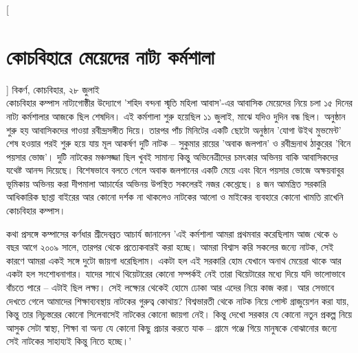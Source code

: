 \documentclass{article}
\newcommand\EN[1]{	 
\fontsize{#1}{#1}\fontspec{Ubuntu}}
\newcommand\BN[1]{ %
\fontsize{#1}{#1}\fontspec[Script=Bengali]{Baban12}}
\newcommand\BBI[1]{ %
\fontsize{#1}{#1}\fontspec[Script=Bengali, FakeSlant=0.2]{BabanBold12}}
\begin{document}
% 
\begin{minipage}[t]{102mm} %
\vspace{8mm}
\setlength{\baselineskip}{2pt}
\setlength{\parskip}{0.15ex} 
\setlength{\parindent}{10pt}
\begin{multicols}{2}%
[\section*{\Centering \BN{28.611}কোচবিহারে মেয়েদের নাট্য কর্মশালা
\\[2mm]
}]
\setcounter{columnbadness}{7000}
\setcounter{finalcolumnbadness}{7000}
\BBI{12.2545}বিকর্ণ, কোচবিহার, ২৮ জুলাই\EN{10}\textbullet\\[0.5mm]
\BN{12.06}কোচবিহার কম্পাস নাট্যগোষ্ঠীর উদ্যোগে 'শহিদ বন্দনা স্মৃতি মহিলা আবাস'-এর আবাসিক মেয়েদের নিয়ে চলা ১৫ দিনের নাট্য কর্মশালার আজকে ছিল শেষদিন। এই কর্মশালা শুরু হয়েছিল ১১ জুলাই, মাঝে যদিও দুদিন বন্ধ ছিল। অনুষ্ঠান শুরু হয় আবাসিকদের গাওয়া রবীন্দ্রসঙ্গীত দিয়ে। তারপর পাঁচ মিনিটের একটি ছোটো অনুষ্ঠান 'যোগা উইথ মুভমেন্ট' শেষ হওয়ার পরই শুরু হয়ে যায় মূল আকর্ষণ দুটি নাটক -- সুকুমার রায়ের 'অবাক জলপান' ও রবীন্দ্রনাথ ঠাকুরের 'বিনে পয়সার ভোজ'। দুটি নাটকের মঞ্চসজ্জা ছিল খুবই সামান্য কিন্তু অভিনেত্রীদের চমৎকার অভিনয় বাকি আবাসিকদের যথেষ্ট আনন্দ দিয়েছে। বিশেষভাবে বলতে গেলে অবাক জলপানের একটি মেয়ে এবং বিনে পয়সার ভোজে অক্ষয়বাবুর ভূমিকায় অভিনয় করা দীপমালা আচার্যের অভিনয় উপস্থিত সকলেরই নজর কেশ্তেছে। ৪ জন আমন্ত্রিত সরকারি আধিকারিক ছাশ্তা বাইরের আর কোনো দর্শক না থাকলেও নাটকের আলো ও মাইকের ব্যবহারে কোনো খামতি রাখেনি কোচবিহার কম্পাস।

কথা প্রসঙ্গে কম্পাসের কর্ণধার শ্রীদেবব্রত আচার্য জানালেন 'এই কর্মশালা আমরা প্রথমবার করেছিলাম আজ থেকে ৬ বছর আগে ২০০৯ সালে, তারপর থেকে প্রত্যেকবারই করা হচ্ছে। আমরা বিশ্বাস করি সকলের জন্যে নাটক, সেই কারণে আমরা একই সঙ্গে দুটো জায়গা ধরেছিলাম। একটা হল এই সরকারি হোম যেখানে অনাথ মেয়েরা থাকে আর একটা হল সংশোধনাগার। যাদের সাথে থিয়েটারের কোনো সম্পর্কই নেই তারা থিয়েটারের মধ্যে দিয়ে যদি ভালোভাবে বাঁচতে পারে -- এটাই ছিল লক্ষ্য। সেই লক্ষ্যের থেকেই হোমে ঢোকা আর এদের নিয়ে কাজ করা। আর সেভাবে দেখতে গেলে আমাদের শিক্ষাব্যবস্থায় নাটকের গুরুত্ব কোথায়? বিশ্বভারতী থেকে নাটক নিয়ে পোস্ট গ্রাজুয়েশন করা যায়, কিন্তু তার নিচুস্তরের কোনো সিলেবাসেই নাটকের কোনো জায়গা নেই। কিন্তু দেখো সরকার যে কোনো নতুন প্রকল্প নিয়ে আসুক সেটা স্বাস্থ্য, শিক্ষা বা অন্য যে কোনো কিছু প্রচার করতে যাক -- গ্রামে গঞ্জে গিয়ে মানুষকে বোঝানোর জন্যে সেই নাটকের সাহায্যই কিন্তু নিতে হচ্ছে।' 


\end{multicols}
\end{minipage}
\end{document}
